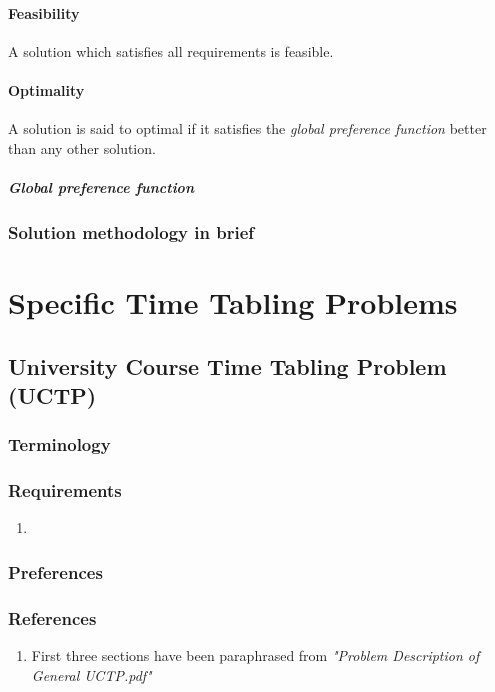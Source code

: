 \documentclass[11pt]{book}
\begin{document}
\subsection{Feasibility}
A solution which satisfies all requirements is feasible.

\subsection{Optimality}
A solution is said to optimal if it satisfies the \textit{global preference function} better than any other solution. 

\subsubsection{Global preference function}


\section{Solution methodology in brief}

\part{Specific Time Tabling Problems}

\chapter{University Course Time Tabling Problem (UCTP)}

\section{Terminology}

\section{Requirements}

\begin{enumerate}
  \item 
\end{enumerate}

\section{Preferences}

\section{References}
\begin{enumerate}
  \item First three sections have been paraphrased from \textit{"Problem Description of General UCTP.pdf"}
\end{enumerate}
\end{document}
